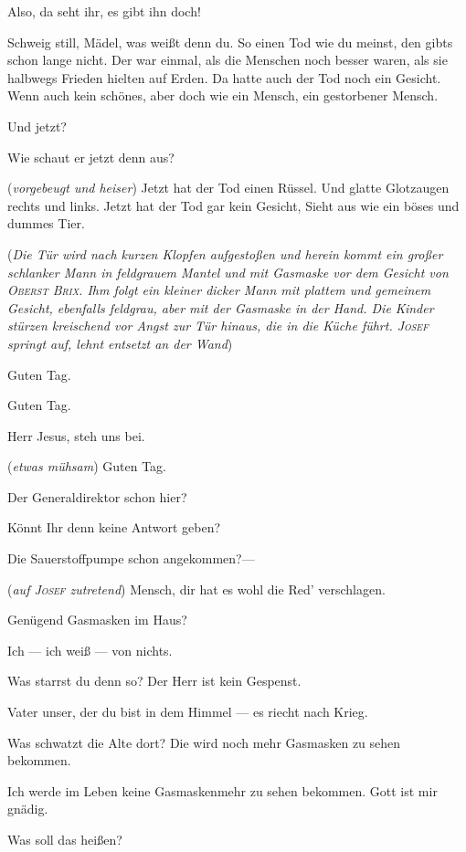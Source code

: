 \documentclass[
	final,
	a4paper,
	ngerman,
	mpinclude = true, %
	twoside = true,
	open = right,
	cleardoublepage = plain,
	DIV = 13,
	BCOR = 1cm,
	titlepage = firstiscover,
	]{scrbook}
\newcommand{\direction}[1]{(\textit{#1})}
\newcommand{\thecharacter}[1]{\textup{\textsc{#1}}\xspace}
\newcommand{\theJosef}{\thecharacter{Josef}}
\newcommand{\theKathrine}{\thecharacter{Kathrine}}
\newcommand{\theBrix}{\thecharacter{Oberst Brix}}
\newcommand{\theMelchior}{\thecharacter{Melchior}}
\newcommand{\character}[1]{\item[#1]}
\newcommand{\Josef}{\character{\theJosef}}
\newcommand{\Kathrine}{\character{\theKathrine}}
\newcommand{\Brix}{\character{\theBrix}}
\newcommand{\Melchior}{\character{\theMelchior}}
\newcommand{\Junge}[1]{\character{Junge #1}}
\newcommand{\Maedchen}[1]{\character{Mädchen #1}}
\begin{document}
\begin{play}
\Maedchen{3}
Also, da seht ihr, es gibt ihn doch!

\Kathrine
Schweig still, Mädel, was weißt denn du. So einen Tod wie du meinst, den gibts schon lange nicht. Der war einmal, als die Menschen noch besser waren, als sie halbwegs Frieden hielten auf Erden. Da hatte auch der Tod noch ein Gesicht. Wenn auch kein schönes, aber doch wie ein Mensch, ein gestorbener Mensch.

\Junge{1}
Und jetzt?

\Maedchen{4}
Wie schaut er jetzt denn aus?

\Kathrine
\direction{vorgebeugt und heiser} Jetzt hat der Tod einen Rüssel. Und glatte Glotzaugen rechts und links. Jetzt hat der Tod gar kein Gesicht, Sieht aus wie ein böses und dummes Tier.

\direction{Die Tür wird nach kurzen Klopfen aufgestoßen und herein kommt ein großer schlanker Mann in feldgrauem Mantel und mit Gasmaske vor dem Gesicht von \theBrix. Ihm folgt ein kleiner dicker Mann mit plattem und gemeinem Gesicht, ebenfalls feldgrau, aber mit der Gasmaske in der Hand. Die Kinder stürzen kreischend vor Angst zur Tür hinaus, die in die Küche führt. \theJosef springt auf, lehnt entsetzt an der Wand}

\Melchior
Guten Tag.

\Brix
Guten Tag.

\Kathrine
Herr Jesus, steh uns bei.

\Josef
\direction{etwas mühsam} Guten Tag.

\Brix
Der Generaldirektor schon hier?

\Melchior
Könnt Ihr denn keine Antwort geben?

\Brix
Die Sauerstoffpumpe schon angekommen?---

\Melchior
\direction{auf \theJosef zutretend} Mensch, dir hat es wohl die Red' verschlagen.

\Brix
Genügend Gasmasken im Haus?

\Josef
Ich --- ich weiß --- von nichts.

\Melchior
Was starrst du denn so? Der Herr ist kein Gespenst.

\Kathrine
Vater unser, der du bist in dem Himmel --- es riecht nach Krieg.

\Melchior
Was schwatzt die Alte dort? Die wird noch mehr Gasmasken zu sehen bekommen.

\Kathrine
Ich werde im Leben keine Gasmaskenmehr zu sehen bekommen. Gott ist mir gnädig.

\Brix
Was soll das heißen?


\end{play}
\end{document}
